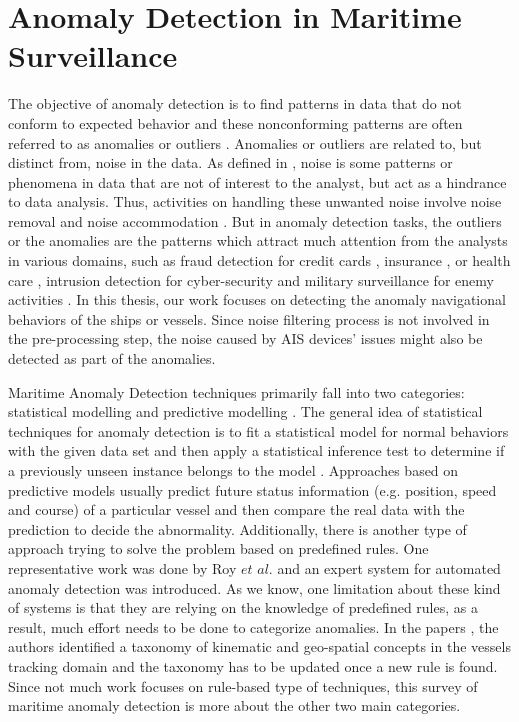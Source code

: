 \documentclass[12pt,glossary]{dalcsthesis}
\begin{document}
\section{Anomaly Detection in Maritime Surveillance}
\label{survey_anomaly_detection}

The objective of anomaly detection is to find patterns in data that do not conform to expected behavior and these nonconforming patterns are often referred to as anomalies or outliers \cite{chandola}. Anomalies or outliers are related to, but distinct from, noise in the data. As defined in \cite{chandola}, noise is some patterns or phenomena in data that are not of interest to the analyst, but act as a hindrance to data analysis. Thus, activities on handling these unwanted noise involve noise removal \cite{teng1990adaptive} and noise accommodation \cite{rousseeuw2005}. But in anomaly detection tasks, the outliers or the anomalies are the patterns which attract much attention from the analysts in various domains, such as fraud detection for credit cards \cite{creditcard}, insurance \cite{insurance}, or health care \cite{healthcare}, intrusion detection
for cyber-security \cite{cyber} and military surveillance for enemy activities \cite{chandola}.  In this thesis, our work focuses on detecting the anomaly navigational behaviors of the ships or vessels. Since noise filtering process is not involved in the pre-processing step, the noise caused by AIS devices' issues might also be detected as part of the anomalies.

Maritime Anomaly Detection techniques primarily fall into two categories: statistical modelling \cite{gmm}\cite{kde}\cite{Gerben} and predictive modelling \cite{PallottaFramework}\cite{bn_White}\cite{bn_Richard}. The general idea of  statistical techniques for anomaly detection is to fit a statistical model for normal behaviors with the given data set and then apply a statistical inference test to determine if a previously unseen instance belongs to the model \cite{chandola}. Approaches based on predictive models usually predict future status information (e.g. position, speed and course) of a particular vessel and then compare the real data with the prediction to decide the abnormality. Additionally, there is another type of approach trying to solve the problem based on predefined rules. One representative work was done by Roy $et$ $al$. \cite{roy2010rule}\cite{roy2009categorization} and an expert system for automated anomaly detection was introduced.  As we know, one limitation about these kind of systems is that they are  relying on the knowledge of predefined rules, as a result, much effort needs to be done to categorize anomalies. In the papers \cite{roy2010rule}\cite{roy2009categorization}, the authors identified a taxonomy of kinematic and geo-spatial concepts in the vessels tracking domain and the taxonomy has to be updated once a new rule is found.  Since not much work focuses on rule-based type of techniques, this survey of maritime anomaly detection is more about the other two main categories.
\end{document}
